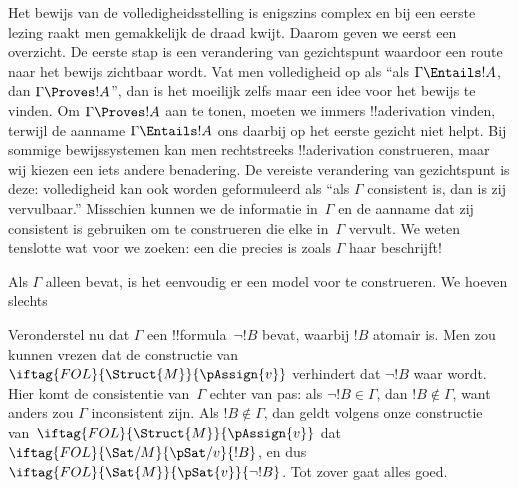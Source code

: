 \documentclass[../../../include/open-logic-section]{subfiles}
\begin{document}
      {}
      {}


Het bewijs van de volledigheidsstelling is enigszins complex en bij
een eerste lezing raakt men gemakkelijk de draad kwijt. Daarom geven
we eerst een overzicht. De eerste stap is een verandering van
gezichtspunt waardoor een route naar het bewijs zichtbaar wordt. Vat
men volledigheid op als ``als $\Gamma \Entails !A$, dan $\Gamma
\Proves !A$'', dan is het moeilijk zelfs maar een idee voor het bewijs
te vinden. Om $\Gamma \Proves !A$ aan te tonen, moeten we immers
!!a{derivation} vinden, terwijl de aanname $\Gamma \Entails !A$ ons
daarbij op het eerste gezicht niet helpt. Bij sommige bewijssystemen
kan men rechtstreeks !!a{derivation} construeren, maar wij kiezen een
iets andere benadering. De vereiste verandering van gezichtspunt is
deze: volledigheid kan ook worden geformuleerd als ``als $\Gamma$
consistent is, dan is zij vervulbaar.'' Misschien kunnen we de
informatie in~$\Gamma$ en de aanname dat zij consistent is gebruiken
om  te construeren die elke
 in~$\Gamma$ vervult. We weten
tenslotte wat voor  we zoeken:
een die precies is zoals $\Gamma$ haar beschrijft!{}

Als $\Gamma$ alleen  bevat, is het eenvoudig
er een model voor te construeren. We hoeven slechts

Veronderstel nu dat $\Gamma$ een !!{formula}~$\lnot !B$ bevat, waarbij
$!B$ atomair is. Men zou kunnen vrezen dat de constructie van
$\iftag{FOL}{\Struct{M}}{\pAssign{v}}$ verhindert dat $\lnot !B$ waar
wordt. Hier komt de consistentie van~$\Gamma$ echter van pas: als
$\lnot !B \in \Gamma$, dan $!B \notin \Gamma$, want anders zou
$\Gamma$ inconsistent zijn. Als $!B \notin \Gamma$, dan geldt volgens
onze constructie van~$\iftag{FOL}{\Struct{M}}{\pAssign{v}}$ dat
$\iftag{FOL}{\Sat/{M}}{\pSat/{v}}{!B}$, en dus
$\iftag{FOL}{\Sat{M}}{\pSat{v}}{\lnot !B}$. Tot zover gaat alles goed.
\end{document}
